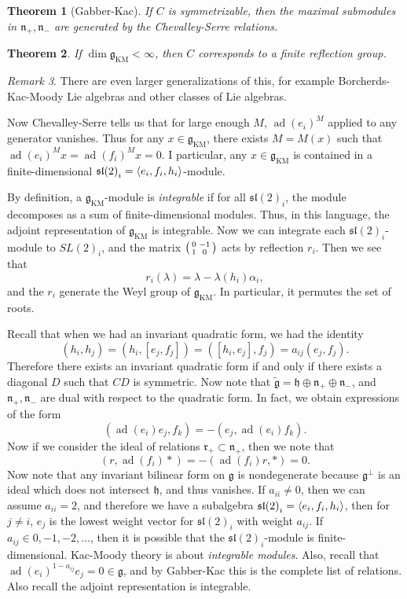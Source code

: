 \documentclass[leqno, openany]{memoir}
\newtheorem{thm}{Theorem}[section]
\theoremstyle{definition}
\theoremstyle{remark}
\newtheorem{rmk}[thm]{Remark}
\theoremstyle{plain}
\theoremstyle{definition}
\theoremstyle{remark}
\newcommand{\mf}[1]{\mathfrak{#1}}
\newcommand{\mr}[1]{\mathrm{#1}}
\newcommand{\wtl}[1]{\widetilde{#1}}
\DeclareMathOperator{\ad}{ad}
\begin{document}
\begin{thm}[Gabber-Kac] If $C$ is symmetrizable, then the maximal submodules in
$\mf{n}_+, \mf{n}_-$ are generated by the Chevalley-Serre relations.  \end{thm}

\begin{thm} If $\dim \mf{g}_{\mr{KM}} < \infty$, then $C$ corresponds to a
finite reflection group.  \end{thm}

\begin{rmk} There are even larger generalizations of this, for example
Borcherds-Kac-Moody Lie algebras and other classes of Lie algebras.  \end{rmk}

Now Chevalley-Serre tells us that for large enough $M$, ${\ad(e_i)}^M$ applied
to any generator vanishes. Thus for any $x \in \mf{g}_{\mr{KM}}$, there exists
$M = M(x)$ such that ${\ad(e_i)}^M x = {\ad(f_i)}^M x = 0$. I particular, any
$x \in \mf{g}_{\mr{KM}}$ is contained in a finite-dimensional ${\mf{sl}(2)}_i =
\ev{e_i, f_i, h_i}$-module.

By definition, a $\mf{g}_{\mr{KM}}$-module is \textit{integrable} if for all
${\mf{sl}(2)}_i$, the module decomposes as a sum of finite-dimensional modules.
Thus, in this language, the adjoint representation of $\mf{g}_{\mr{KM}}$ is
integrable. Now we can integrate each ${\mf{sl}(2)}_i$-module to ${SL(2)}_i$,
and the matrix $\begin{psmallmatrix} 0 & -1 \\ 1 & 0 \end{psmallmatrix}$ acts
by reflection $r_i$. Then we see that \[ r_i(\lambda) = \lambda - \lambda(h_i)
\alpha_i, \] and the $r_i$ generate the Weyl group of $\mf{g}_{\mr{KM}}$. In
particular, it permutes the set of roots.

Recall that when we had an invariant quadratic form, we had the identity \[
(h_i, h_j) = (h_i, [e_j, f_j]) = ([h_i, e_j], f_j) = a_{ij} (e_j, f_j). \]
Therefore there exists an invariant quadratic form if and only if there exists
a diagonal $D$ such that $CD$ is symmetric. Now note that $\wtl{ \mf{g} } =
\mf{h} \oplus \mf{n}_+ \oplus \mf{n}_-$, and $\mf{n}_+, \mf{n}_-$ are dual with
respect to the quadratic form. In fact, we obtain expressions of the form \[ (
    \ad(e_i) e_j, f_k ) = - (e_j, \ad(e_i) f_k). \] Now if we consider the
    ideal of relations $\mf{r}_+ \subset \mf{n}_+$, then we note that \[ (r,
    \ad(f_i) *) = - (\ad(f_i) r, *) = 0. \] Now note that any invariant
    bilinear form on $\mf{g}$ is nondegenerate because $\mf{g}^{\perp}$ is an
    ideal which does not intersect $\mf{h}$, and thus vanishes. If $a_{ii} \neq
    0$, then we can assume $a_{ii} = 2$, and therefore we have a subalgebra
    ${\mf{sl}(2)}_i = \ev{e_i, f_i, h_i}$, then for $j \neq i$, $e_j$ is the
    lowest weight vector for ${\mf{sl}(2)}_i$ with weight $a_{ij}$. If $a_{ij}
    \in 0,-1,-2,\ldots$, then it is possible that the ${\mf{sl}(2)}_i$-module
    is finite-dimensional. Kac-Moody theory is about \textit{integrable
    modules}. Also, recall that ${\ad(e_i)}^{1-a_{ij}} e_j = 0 \in \mf{g}$, and
    by Gabber-Kac this is the complete list of relations. Also recall the
    adjoint representation is integrable.
\end{document}
